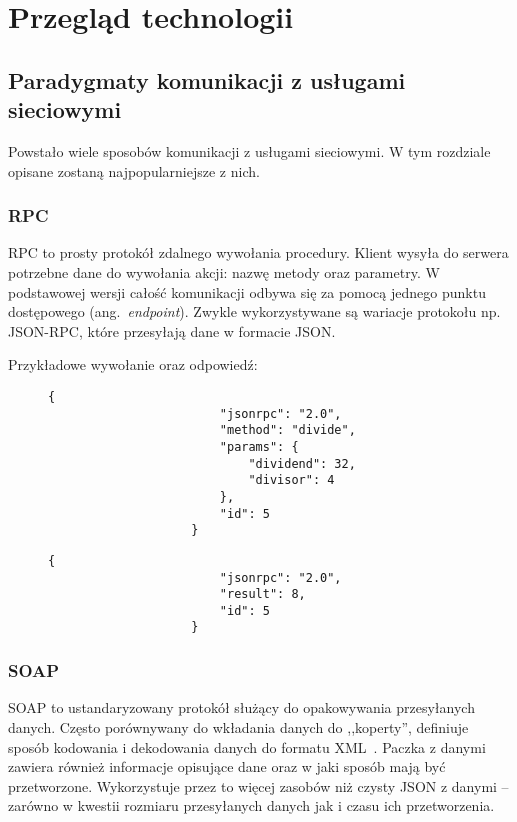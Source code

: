
\chapter{Przegląd technologii}
\label{sec:przegTech}

\section{Paradygmaty komunikacji z usługami sieciowymi}
	Powstało wiele sposobów komunikacji z usługami sieciowymi.
	W tym rozdziale opisane zostaną najpopularniejsze z nich.

	\subsection{RPC}
		RPC to prosty protokół zdalnego wywołania procedury.
		Klient wysyła do serwera potrzebne dane do wywołania akcji: nazwę metody oraz parametry.
		W podstawowej wersji całość komunikacji odbywa się za pomocą jednego punktu dostępowego (ang.\ \emph{endpoint}).
		Zwykle wykorzystywane są wariacje protokołu np. JSON-RPC, które przesyłają dane w formacie JSON.

		Przykładowe wywołanie oraz odpowiedź:
		\begin{figure}[!htb]
			\centering
			\begin{minipage}{.5\textwidth}
				\begin{lstlisting}[label=lst:rpcReq]
					{
						"jsonrpc": "2.0",
						"method": "divide",
						"params": {
							"dividend": 32,
							"divisor": 4
						},
						"id": 5
					}
				\end{lstlisting}	
			\end{minipage}%
			\begin{minipage}{0.5\textwidth}
				\begin{lstlisting}[label=lst:rpcRes]
					{
						"jsonrpc": "2.0",
						"result": 8,
						"id": 5
					}
				\end{lstlisting}
			\end{minipage}
		\end{figure}

	\subsection{SOAP}
		SOAP to ustandaryzowany protokół służący do opakowywania przesyłanych danych. 
		Często porównywany do wkładania danych do ,,koperty'', definiuje sposób kodowania i dekodowania danych do formatu XML~\cite{SOAP}.
		Paczka z danymi zawiera również informacje opisujące dane oraz w jaki sposób mają być przetworzone.
		Wykorzystuje przez to więcej zasobów niż czysty JSON z danymi -- zarówno w kwestii rozmiaru przesyłanych danych jak i czasu ich przetworzenia.
		
